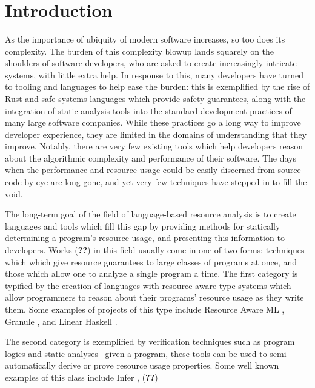 \documentclass[draft]{westhesis}
\title{ }
\author{ }
\begin{document}
\mainmatter

\chapter{Introduction}
As the importance of ubiquity of modern software increases, so too does its complexity. The burden of this complexity blowup lands squarely on the shoulders of software developers, who are asked to create increasingly intricate systems, with little extra help. In response to this, many developers have turned to tooling and languages to help ease the burden: this is exemplified by the rise of Rust and safe systems languages \citehere which provide safety guarantees, along with the integration of static analysis tools into the standard development practices of many large software companies. While these practices go a long way to improve developer experience, they are limited in the domains of understanding that they improve. Notably, there are very few existing tools which help developers reason about the algorithmic complexity and performance of their software. The days when the performance and resource usage could be easily discerned from source code by eye are long gone, and yet very few techniques have stepped in to fill the void.

The long-term goal of the field of language-based resource analysis is to create languages and tools which fill this gap by providing methods for statically determining a program's resource usage, and presenting this information to developers. Works (\textbf{??}) in this field usually come in one of two forms: techniques which which give resource guarantees to large classes of programs at once, and those which allow one to analyze a single program a time. The first category is typified by the creation of languages with resource-aware type systems which allow programmers to reason about their programs' resource usage as they write them. Some examples of projects of this type include Resource Aware ML \citehere, Granule \citehere, and Linear Haskell \citehere.

The second category is exemplified by verification techniques such as program logics and static analyses-- given a program, these tools can be used to semi-automatically derive or prove resource usage properties. Some well known examples of this class include Infer \citehere, (\textbf{??})
\end{document}
